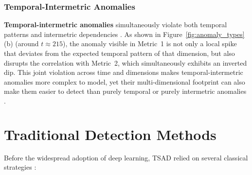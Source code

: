 \documentclass[twoside,11pt,openright]{report}
\begin{document}
\subsubsection{Temporal-Intermetric Anomalies}

\textbf{Temporal-intermetric anomalies} simultaneously violate both temporal patterns
and intermetric dependencies \citep{darban2024survey}. As shown in
Figure~\ref{fig:anomaly_types}(b) (around $t \approx 215$), the anomaly visible in
Metric~1 is not only a local spike that deviates from the expected temporal pattern of
that dimension, but also disrupts the correlation with Metric~2, which simultaneously
exhibits an inverted dip. This joint violation across time and dimensions makes
temporal-intermetric anomalies more complex to model, yet their multi-dimensional
footprint can also make them easier to detect than purely temporal or purely intermetric
anomalies \citep{darban2024survey}.


\section{Traditional Detection Methods}

Before the widespread adoption of deep learning, TSAD relied on several classical strategies \citep{darban2024survey}:
 
\end{document}

